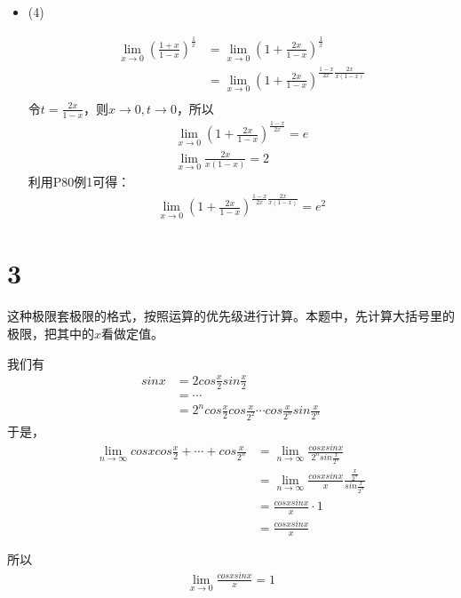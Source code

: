 \documentclass{article}
\begin{document}
\begin{itemize}
  \item (4)

        \begin{align*}
          \lim\limits_{x \to 0} \left(\frac{1 + x}{1 - x}\right)^{\frac{1}{x}}
           & = \lim\limits_{x \to 0} \left(1 + \frac{2x}{1 - x}\right)^{\frac{1}{x}}                       \\
           & = \lim\limits_{x \to 0} \left(1 + \frac{2x}{1 - x}\right)^{\frac{1 - x}{2x}\frac{2x}{x(1-x)}} \\
        \end{align*}
        令$t = \frac{2x}{1 - x}$，则$x \to 0, t \to 0$，所以
        \begin{align*}
          \lim\limits_{x \to 0} \left(1 + \frac{2x}{1 - x}\right)^{\frac{1 - x}{2x}} = e \\
          \lim\limits_{x \to 0} \frac{2x}{x(1-x)} = 2
        \end{align*}
        利用P80例1可得：\\
        \begin{align*}
          \lim\limits_{x \to 0} \left(1 + \frac{2x}{1 - x}\right)^{\frac{1 - x}{2x}\frac{2x}{x(1-x)}} = e^2
        \end{align*}
\end{itemize}

\section*{3}

\begin{zremark}
  这种极限套极限的格式，按照运算的优先级进行计算。本题中，先计算大括号里的极限，把其中的$x$看做定值。
\end{zremark}

我们有
\begin{align*}
  sinx & = 2 cos\frac{x}{2} sin\frac{x}{2}                                             \\
       & = \cdots                                                                      \\
       & = 2^n cos\frac{x}{2} cos\frac{x}{2^2} \cdots cos\frac{x}{2^n}sin\frac{x}{2^n}
\end{align*}
于是，
\begin{align*}
  \lim_{n\to\infty} cosx cos\frac{x}{2} + \cdots + cos\frac{x}{2^n}
   & = \lim_{n\to\infty} \frac{cosx sinx}{2^n sin\frac{x}{2^n}}                    \\
   & = \lim_{n\to\infty} \frac{cosx sinx}{x}\frac{\frac{x}{2^n}}{sin\frac{x}{2^n}} \\
   & = \frac{cosx sinx}{x} \cdot 1                                                 \\
   & = \frac{cosx sinx}{x}
\end{align*}

所以
\begin{align*}
  \lim\limits_{x \to 0} \frac{cosx sinx}{x} = 1
\end{align*}
\end{document}
